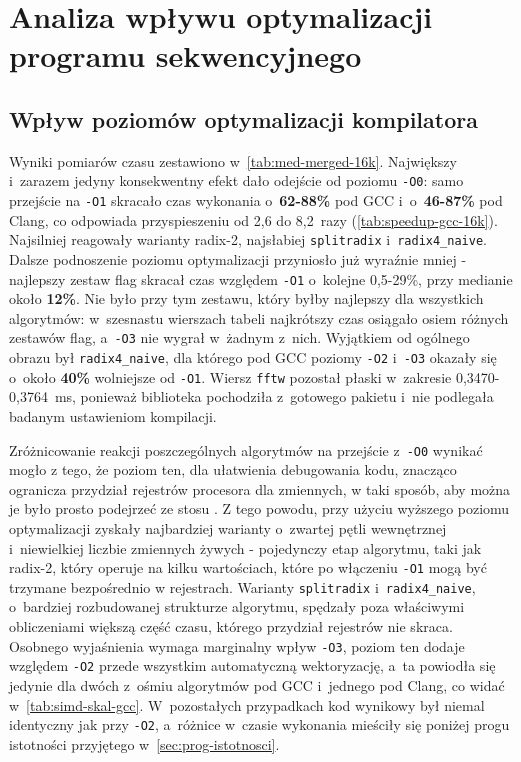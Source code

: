 \section{Analiza wpływu optymalizacji programu sekwencyjnego}

\subsection{Wpływ poziomów optymalizacji kompilatora}
Wyniki pomiarów czasu zestawiono w~\cref{tab:med-merged-16k}. Największy
i~zarazem jedyny konsekwentny efekt dało odejście od poziomu \texttt{-O0}: samo
przejście na \texttt{-O1} skracało czas wykonania o~\textbf{62-88\%} pod GCC
i~o~\textbf{46-87\%} pod Clang, co odpowiada przyspieszeniu od 2,6 do 8,2~razy (\cref{tab:speedup-gcc-16k}).
Najsilniej reagowały warianty radix-2, najsłabiej \texttt{splitradix}
i~\texttt{radix4\_naive}. Dalsze podnoszenie poziomu optymalizacji przyniosło już
wyraźnie mniej - najlepszy zestaw flag skracał czas względem \texttt{-O1}
o~kolejne 0,5-29\%, przy medianie około \textbf{12\%}. Nie było przy tym zestawu, który
byłby najlepszy dla wszystkich algorytmów: w~szesnastu wierszach tabeli
najkrótszy czas osiągało osiem różnych zestawów flag, a~\texttt{-O3} nie wygrał
w~żadnym z~nich. Wyjątkiem od ogólnego obrazu był \texttt{radix4\_naive}, dla
którego pod GCC poziomy \texttt{-O2} i~\texttt{-O3} okazały się o~około \textbf{40\%}
wolniejsze od \texttt{-O1}. Wiersz \texttt{fftw} pozostał płaski w~zakresie
0,3470-0,3764~ms, ponieważ biblioteka pochodziła z~gotowego pakietu i~nie
podlegała badanym ustawieniom kompilacji.

Zróżnicowanie reakcji poszczególnych algorytmów na przejście z~\texttt{-O0}
wynikać mogło z tego, że poziom ten, dla ułatwienia debugowania kodu, znacząco ogranicza przydział rejestrów procesora dla zmiennych, w 
taki sposób, aby można je było prosto podejrzeć ze stosu \cite{Kompilatory_Aho}.
Z tego powodu, przy użyciu wyższego poziomu optymalizacji zyskały najbardziej warianty o~zwartej pętli
wewnętrznej i~niewielkiej liczbie zmiennych żywych - pojedynczy etap
algorytmu, taki jak radix-2, który operuje na kilku wartościach, które po włączeniu
\texttt{-O1} mogą być trzymane bezpośrednio w rejestrach. Warianty \texttt{splitradix}
i~\texttt{radix4\_naive}, o~bardziej rozbudowanej strukturze algorytmu,
spędzały poza właściwymi obliczeniami większą część czasu, którego
przydział rejestrów nie skraca. Osobnego wyjaśnienia wymaga marginalny wpływ \texttt{-O3}, poziom
ten dodaje względem \texttt{-O2} przede wszystkim automatyczną wektoryzację,
a~ta powiodła się jedynie dla dwóch z~ośmiu algorytmów pod GCC i~jednego pod
Clang, co widać w~\cref{tab:simd-skal-gcc}. W~pozostałych
przypadkach kod wynikowy był niemal identyczny jak przy \texttt{-O2}, a~różnice
w~czasie wykonania mieściły się poniżej progu istotności przyjętego
w~\cref{sec:prog-istotnosci}.

